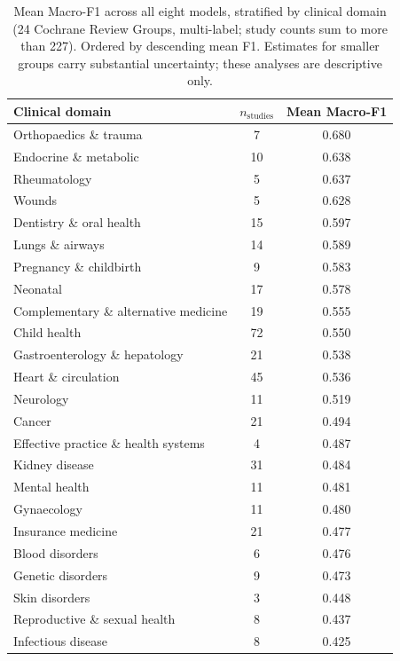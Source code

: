 \documentclass[../main.tex]{subfiles}
\begin{document}
\begin{table}[ht]
\centering
\caption{Mean Macro-F1 across all eight models, stratified by clinical domain
(24 Cochrane Review Groups, multi-label; study counts sum to more than 227).
Ordered by descending mean F1.
Estimates for smaller groups carry substantial uncertainty; these analyses are
descriptive only.}
\label{tab:clinical-full}
\begin{tabular}{lcc}
\toprule
Clinical domain & $n_{\text{studies}}$ & Mean Macro-F1 \\
\midrule
Orthopaedics \& trauma                 &  7 & 0.680 \\
Endocrine \& metabolic                 & 10 & 0.638 \\
Rheumatology                           &  5 & 0.637 \\
Wounds                                 &  5 & 0.628 \\
Dentistry \& oral health               & 15 & 0.597 \\
Lungs \& airways                       & 14 & 0.589 \\
Pregnancy \& childbirth                &  9 & 0.583 \\
Neonatal                               & 17 & 0.578 \\
Complementary \& alternative medicine  & 19 & 0.555 \\
Child health                           & 72 & 0.550 \\
Gastroenterology \& hepatology         & 21 & 0.538 \\
Heart \& circulation                   & 45 & 0.536 \\
Neurology                              & 11 & 0.519 \\
Cancer                                 & 21 & 0.494 \\
Effective practice \& health systems   &  4 & 0.487 \\
Kidney disease                         & 31 & 0.484 \\
Mental health                          & 11 & 0.481 \\
Gynaecology                            & 11 & 0.480 \\
Insurance medicine                     & 21 & 0.477 \\
Blood disorders                        &  6 & 0.476 \\
Genetic disorders                      &  9 & 0.473 \\
Skin disorders                         &  3 & 0.448 \\
Reproductive \& sexual health          &  8 & 0.437 \\
Infectious disease                     &  8 & 0.425 \\
\bottomrule
\end{tabular}
\end{table}
\end{document}
